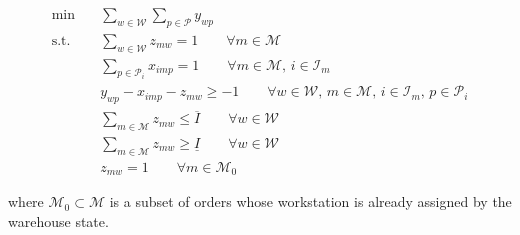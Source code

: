 \documentclass[a4paper,10pt]{article}
\begin{document}
\begin{align}
    \min \quad 
    & \sum_{w \in \mathcal{W}} \sum_{p \in \mathcal{P}} y_{wp} \label{M1_Obj} \\[4pt]
    \text{s.t.} \quad
    & \sum_{w \in \mathcal{W}} z_{mw} = 1 
     \qquad \forall m \in \mathcal{M} \label{M1_Constr1} \\
    & \sum_{p \in \mathcal{P}_i} x_{imp} = 1 
     \qquad \forall m \in \mathcal{M},\, i \in \mathcal{I}_m \label{M1_Constr2} \\
    & y_{wp} - x_{imp} - z_{mw} \ge -1 
     \qquad \forall w \in \mathcal{W},\, m \in \mathcal{M},\, i \in \mathcal{I}_m,\, p \in \mathcal{P}_i \label{M1_Constr3} \\
    & \sum_{m \in \mathcal{M}} z_{mw} \le \overline{I} 
     \qquad \forall w \in \mathcal{W} \label{M1_Constr4} \\
    & \sum_{m \in \mathcal{M}} z_{mw} \ge \underline{I} 
     \qquad \forall w \in \mathcal{W} \label{M1_Constr5} \\
    & z_{mw} = 1 
     \qquad \forall m \in \mathcal{M}_0 \label{M1_InitialCond}
\end{align}

where $\mathcal{M}_0 \subset \mathcal{M}$ is a subset of orders whose workstation is already assigned by the warehouse state.
\end{document}
